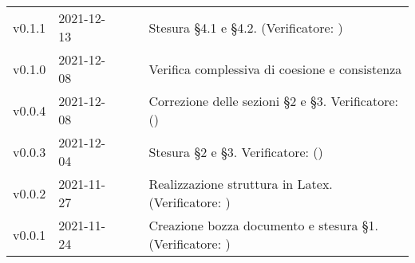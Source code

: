 \begin{longtable}{ m{}<{\centering}  m{}<{\centering}  m{}<{\centering}  m{}<{\centering}  m{}<{\centering} }
	v0.1.1& 2021-12-13 & \MB{} & \AM{} & Stesura §4.1 e §4.2. (Verificatore: \textit{\FP})\\

	v0.1.0& 2021-12-08 & \EP{} & \VE{} & Verifica complessiva di coesione e consistenza \\	

	v0.0.4& 2021-12-08 & \MB{} & \AM{} & Correzione delle sezioni §2 e §3. Verificatore: (\textit{\FP}) \\

	v0.0.3& 2021-12-04 & \MB{} & \AM{} & Stesura §2 e §3. Verificatore: (\textit{\FP}) \\

	v0.0.2& 2021-11-27 & \EP{} & \AM{} & Realizzazione struttura in Latex. (Verificatore: \textit{\FP})\\

	v0.0.1& 2021-11-24 & \MB{} & \RE{} & Creazione bozza documento e stesura §1. (Verificatore: \textit{\FP}) \\

\end{longtable}

\pagebreak
